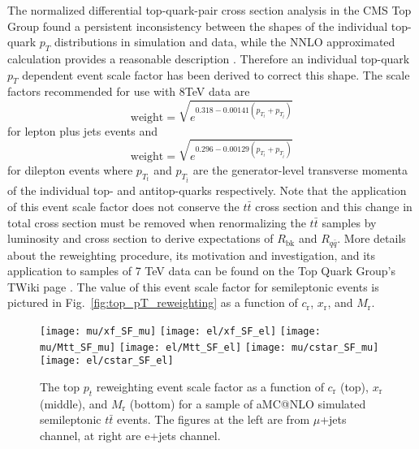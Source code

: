 \documentclass{cmspaperpdf}
\begin{document}
The normalized differential top-quark-pair cross section analysis in the CMS Top Group found a persistent inconsistency between the shapes of the individual top-quark $p_{T}$ distributions in simulation and data, while the NNLO approximated calculation \cite{Kidonakis2012} provides a reasonable description \cite{pT_reweighting_TWiki}. Therefore an individual top-quark $p_{T}$ dependent event scale factor has been derived to correct this shape. The scale factors recommended for use with 8TeV data are 
\begin{equation}
\mathrm{weight} = \sqrt{e^{0.318-0.00141(p_{T_{t}}+p_{T_{\bar{t}}})}}
\end{equation}
for lepton plus jets events and
\begin{equation}
\mathrm{weight} = \sqrt{e^{0.296-0.00129(p_{T_{t}}+p_{T_{\bar{t}}})}}
\end{equation}
for dilepton events where $p_{T_{t}}$ and $p_{T_{\bar{t}}}$ are the generator-level transverse momenta of the individual top- and antitop-quarks respectively. Note that the application of this event scale factor does not conserve the $t\bar{t}$ cross section and this change in total cross section must be removed when renormalizing the $t\bar{t}$ samples by luminosity and cross section to derive expectations of $R_\mathrm{bk}$ and $R_{q\bar q}$. More details about the reweighting procedure, its motivation and investigation, and its application to samples of 7 TeV data can be found on the Top Quark Group's TWiki page \cite{pT_reweighting_TWiki}. The value of this event scale factor for semileptonic events is pictured in Fig.~\ref{fig:top_pT_reweighting} as a function of $c_\mathrm{r}$, $x_\mathrm{r}$, and $M_\mathrm{r}$.

\begin{figure}[hbt]
  \begin{center}
    \texttt{[image: mu/xf\_SF\_mu]}
    \texttt{[image: el/xf\_SF\_el]}   
    \texttt{[image: mu/Mtt\_SF\_mu]}
    \texttt{[image: el/Mtt\_SF\_el]}
    \texttt{[image: mu/cstar\_SF\_mu]}
    \texttt{[image: el/cstar\_SF\_el]}
  \caption{\small The top $p_{t}$ reweighting event scale factor as a function of $c_\mathrm{r}$ (top), $x_\mathrm{r}$ (middle), and $M_\mathrm{r}$ (bottom) for a sample of aMC@NLO simulated semileptonic $t\bar{t}$ events.  The figures at the left are from $\mu$+jets channel, at right are e+jets channel.}
    \label{fig:cost_reco}
  \end{center}
\end{figure}
\end{document}
